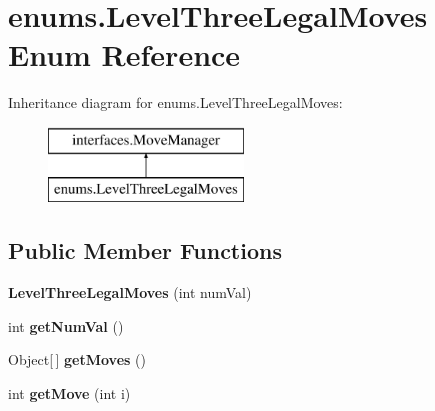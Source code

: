 \hypertarget{enumenums_1_1_level_three_legal_moves}{\section{enums.\-Level\-Three\-Legal\-Moves Enum Reference}
\label{enumenums_1_1_level_three_legal_moves}
}
Inheritance diagram for enums.\-Level\-Three\-Legal\-Moves\-:\begin{figure}[H]
\begin{center}
\leavevmode
\includegraphics[height=2.000000cm]{enumenums_1_1_level_three_legal_moves}
\end{center}
\end{figure}
\subsection*{Public Member Functions}
\begin{DoxyCompactItemize}
\item 
\hypertarget{enumenums_1_1_level_three_legal_moves_afcdd877714e65ebe80b6ce8d3056d692}{{\bfseries Level\-Three\-Legal\-Moves} (int num\-Val)}\label{enumenums_1_1_level_three_legal_moves_afcdd877714e65ebe80b6ce8d3056d692}

\item 
\hypertarget{enumenums_1_1_level_three_legal_moves_a34c8c71ab95d30b5720b853a2a9db9bc}{int {\bfseries get\-Num\-Val} ()}\label{enumenums_1_1_level_three_legal_moves_a34c8c71ab95d30b5720b853a2a9db9bc}

\item 
\hypertarget{enumenums_1_1_level_three_legal_moves_a6cd90512f13986d23defb2c6e5439313}{Object\mbox{[}$\,$\mbox{]} {\bfseries get\-Moves} ()}\label{enumenums_1_1_level_three_legal_moves_a6cd90512f13986d23defb2c6e5439313}

\item 
\hypertarget{enumenums_1_1_level_three_legal_moves_a1492b9e5bf07ed7bac6e194747bb253f}{int {\bfseries get\-Move} (int i)}\label{enumenums_1_1_level_three_legal_moves_a1492b9e5bf07ed7bac6e194747bb253f}

\end{DoxyCompactItemize}
